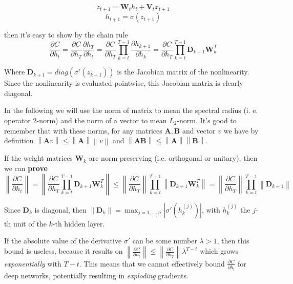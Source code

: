 \documentclass{article} %
\newcommand{\matr}[1]{\mathbf{#1}}
\newcommand\norm[1]{\left\lVert#1\right\rVert}
\begin{document}
\begin{equation}
  z_{t+1} = \matr{W}_t h_t + \matr{V}_t x_{t+1}
\end{equation}
\begin{equation}
  h_{t+1} = \sigma (z_{t+1})
\end{equation}

then it's easy to show by the chain rule
\begin{equation}
  \frac{\partial C}{\partial h_t} = \frac{\partial C}{\partial h_T} \frac{\partial h_T}{\partial h_t} = \frac{\partial C}{\partial h_T} \prod_{k=t}^{T-1} \frac{\partial h_{k+1}}{\partial h_k} = \frac{\partial C}{\partial h_T} \prod_{k=t}^{T-1} \matr{D}_{k+1} \matr{W}_k^T
\end{equation}

Where $\matr{D}_{k+1} = diag(\sigma'(z_{k+1}))$ is the Jacobian matrix of the nonlinearity. Since the nonlinearity is evaluated pointwise, this Jacobian matrix is clearly diagonal.

In the following we will use the norm of matrix to mean the spectral radius (i. e. operator 2-norm) and the norm of a vector to mean $L_2$-norm. It's good to remember that with these norms, for any matrices $\matr{A}, \matr{B}$ and vector $v$ we have by definition $\norm{\matr{A}v} \leq \norm{\matr{A}} \norm{v}$ and $\norm{\matr{A}\matr{B}} \leq \norm{\matr{A}} \norm{\matr{B}}$.

If the weight matrices $\matr{W}_k$ are norm preserving (i.e. orthogonal or unitary), then we can {\bf{prove}}
\begin{equation}
  \norm{ \frac{\partial C}{\partial h_t} } = \norm{ \frac{\partial C}{\partial h_T} \prod_{k=t}^{T-1} \matr{D}_{k+1} \matr{W}_k^T } \leq \norm{\frac{\partial C}{\partial h_T}} \prod_{k=t}^{T-1} \norm{ \matr{D}_{k+1} \matr{W}_k^T } = \norm{ \frac{\partial C}{\partial h_T}} \prod_{k=t}^{T-1} \norm{\matr{D}_{k+1}}
\end{equation}

Since $\matr{D}_k$ is diagonal, then $\norm{\matr{D}_k} = \max_{j=1, ..., n} |\sigma'(h_k^{(j)})|$, with $h_k^{(j)}$ the $j$-th unit of the $k$-th hidden layer.

If the absolute value of the derivative $\sigma'$ can be some number $\lambda > 1$, then this bound is useless, because it results on $\norm{\frac{\partial C}{\partial h_t}} \leq \norm{\frac{\partial C}{\partial h_T}} \lambda^{T-t}$ which grows {\it{exponentially}} with $T-t$. This means that we cannot effectively bound $\frac{\partial C}{\partial h_t}$ for deep networks, potentially resulting in {\it{exploding}} gradients.
\end{document}
